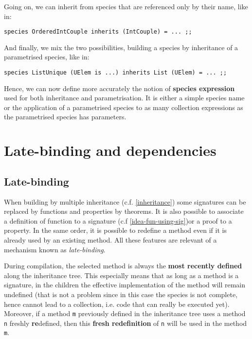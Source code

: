 Going on, we can  inherit
from species that are referenced only by their name, like in:
{\scriptsize
\begin{lstlisting}
species OrderedIntCouple inherits (IntCouple) = ... ;;
\end{lstlisting}
}

And finally, we mix the two possibilities, building a species by
inheritance of a parametrised species, like in: {\scriptsize
\begin{lstlisting}
species ListUnique (UElem is ...) inherits List (UElem) = ... ;;
\end{lstlisting}
}

Hence, we can now define more accurately the notion of {\bf species
expression} used for both inheritance and parametrisation. It is either
a simple species name or the application of a parametrised species to
as many collection expressions as the parametrised species has
parameters.


\section{Late-binding and dependencies}

\subsection{Late-binding}
\label{late-binding}
 When building by multiple inheritance
(c.f. \ref{inheritance}) some signatures can be replaced by functions
and properties by theorems. It is also possible to associate a
definition of function to a signature (c.f \ref{idea-fun-using-sig})or
a proof to a property. In the same order, it is possible to redefine a
method even if it is  already used by an existing method.
All these features are relevant of a mechanism known as {\em
  late-binding}. 


During compilation, the selected method is always the {\bf most
recently defined} along the inheritance tree. This especially means
that as long as a method is a signature, in the children the effective
implementation of the method will remain undefined (that is not a
problem since in this case the species is not complete, hence cannot
lead to a collection, i.e. code that can really be executed
yet). Moreover, if a method {\tt m} previously defined in the
inheritance tree uses a method {\tt n} freshly {\bf re}defined, then
this {\bf fresh redefinition} of {\tt n} will be used in the method
{\tt m}.


